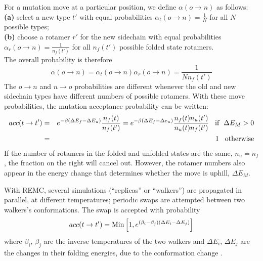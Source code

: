 For a mutation move at a particular position, we define $\alpha(o \rightarrow n)$ as follows: \\
{\bf (a)} select a new type $t'$ with equal probabilities $\alpha_t(o \rightarrow n) = \frac{1}{N}$ 
for all $N$ possible types; \\
{\bf (b)} choose a rotamer $r'$ for the new sidechain with equal probabilities $\alpha_r(o \rightarrow n) 
= \frac{1}{n_f(t')}$ for all $n_f(t')$ possible folded state rotamers. \\
The overall probability is therefore
\begin{equation}
\alpha(o \rightarrow n) = \alpha_t(o \rightarrow n) \alpha_r(o \rightarrow n) = \frac{1}{N n_f(t')}
\end{equation}
The $o \rightarrow n$ and $n \rightarrow o$ probabilities are different whenever the old and new sidechain
types have different numbers of possible rotamers.
With these move probabilities, the mutation acceptance
probability can be written:
\begin{eqnarray} \label{eq:rule2}
acc(t \rightarrow t') &=& e^{-\beta (\Delta E_f - \Delta E_u)} \frac{ n_f(t) }{ n_f(t') }
 = e^{-\beta (\Delta E_f - \Delta e_u)} \frac{ n_f(t) n_u(t') }{ n_u(t) n_f(t') } 
             {\rm \hspace*{3mm} if \hspace*{2mm} } \Delta E_M > 0 \\
                      &=& 1 {\rm \hspace*{3mm} otherwise}
\end{eqnarray}
If the number of rotamers in the folded and unfolded states are the same, $n_u = n_f$, the fraction on the right
will cancel out.
However, the rotamer numbers also appear in the energy change that determines whether the move is
uphill, $\Delta E_M$.

With REMC, several simulations (``replicas'' or ``walkers'') are propagated in parallel, at different temperatures;
periodic swaps are attempted between two walkers's conformations.
The swap is accepted with probability
\begin{equation} \label{eq:remc}
acc(t \rightarrow t') = {\rm Min} \left[ 1, e^{(\beta_i - \beta_j)(\Delta E_i - \Delta E_j)} \right]
\end{equation}
where $\beta_i$, $\beta_j$ are the inverse temperatures of the two walkers and $\Delta E_i$, $\Delta E_j$
are the changes in their folding energies, due to the conformation change \cite{Kofke02,Earl05}.

